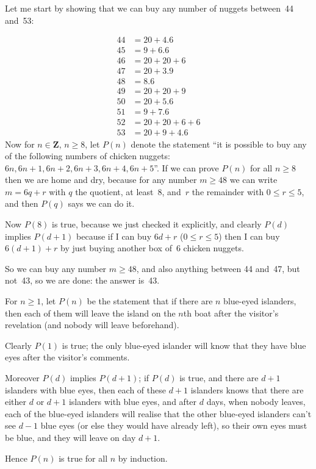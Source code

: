 \documentclass[10pt]{article}
\newcommand{\Z}{\mathbf{Z}}
\begin{document}
Let me start by showing that we can buy any number of nuggets between~44 and~53:

\begin{align*}
44&=20+4.6\\
45&=9+6.6\\
46&=20+20+6\\
47&=20+3.9\\
48&=8.6\\
49&=20+20+9\\
50&=20+5.6\\
51&=9+7.6\\
52&=20+20+6+6\\
53&=20+9+4.6
\end{align*}
Now for $n\in\Z$, $n\geq8$, let $P(n)$ denote the statement ``it is possible to buy any of the following numbers of chicken nuggets: $6n, 6n+1, 6n+2, 6n+3, 6n+4, 6n+5$''. If we can prove $P(n)$ for all $n\geq8$ then we are home and dry, because for any number $m\geq48$ we can write $m=6q+r$ with $q$ the quotient, at least~8, and~$r$ the remainder with $0\leq r\leq 5$, and then $P(q)$ says we can do it.

Now $P(8)$ is true, because we just checked it explicitly, and clearly $P(d)$ implies $P(d+1)$ because if I can buy $6d+r$ ($0\leq r\leq 5$) then I can buy $6(d+1)+r$ by just buying another box of~6 chicken nuggets.

So we can buy any number $m\geq48$, and also anything between 44 and~47, but not~43, so we are done: the answer is~43.

\medskip{} For $n\geq1$, let $P(n)$ be the statement that if there are $n$ blue-eyed islanders, then each of them will leave the island on the $n$th boat after the visitor's revelation (and nobody will leave beforehand).

Clearly $P(1)$ is true; the only blue-eyed islander will know that they have blue eyes after the visitor's comments.

Moreover $P(d)$ implies $P(d+1)$; if $P(d)$ is true, and there are $d+1$ islanders with blue eyes, then each of these $d+1$ islanders knows that there are either $d$ or $d+1$ islanders with blue eyes, and after $d$ days, when nobody leaves, each of the blue-eyed islanders will realise that the other blue-eyed islanders can't see $d-1$ blue eyes (or else they would have already left), so their own eyes must be blue, and they will leave on day $d+1$.

Hence $P(n)$ is true for all $n$ by induction.
\end{document}
